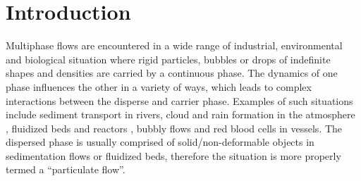 \chapter{Introduction}\label{ch:introduction}

Multiphase flows are encountered in a wide range of industrial, environmental and biological situation where rigid particles, bubbles or drops of indefinite shapes and densities are carried by a continuous phase. The dynamics of one phase influences the other in a variety of ways, which leads to complex interactions between the disperse and carrier phase. Examples of such situations include sediment transport in rivers, cloud and rain formation in the atmosphere \cite{Doychev2014}, fluidized beds and reactors \cite{Wachs2009}, bubbly flows and red blood cells in vessels. The dispersed phase is usually comprised of solid/non-deformable objects in sedimentation flows or fluidized beds, therefore the situation is more properly termed a ``particulate flow''.
